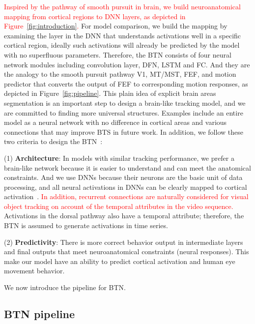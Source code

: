 \documentclass[journal]{IEEEtran}
\begin{document}
\textcolor{red}{
	Inspired by the pathway of smooth pursuit in brain, we build neuroanatomical mapping from cortical regions to DNN layers, as depicted in Figure~\ref{fig:introduction}.}
For model comparison, we build the mapping by examining the layer in the DNN that understands activations well in a specific cortical region, 
ideally such activations will already be predicted by the model with no superfluous parameters. 
Therefore, the BTN consists of four neural network modules including convolution layer, DFN, LSTM and FC.
And they are the analogy to the smooth pursuit pathway V1, MT/MST, FEF, 
and motion predictor that converts the output of FEF to corresponding motion responses, as depicted in Figure~\ref{fig:pipeline}. 
This plain idea of explicit brain areas segmentation is an important step to design a brain-like tracking model, 
and we are committed to finding more universal structures. 
Examples include an entire model as a neural network with no difference in cortical areas
and various connections that may improve BTS in future work.
In addition, we follow these two criteria to design the BTN~\cite{kubilius2018predict}:

(1) \textbf{Architecture}: In models with similar tracking performance, we prefer a brain-like network because it is easier to understand and can meet the anatomical constraints.
And we use DNNs because their neurons are the basic unit of data processing, 
and all neural activations in DNNs can be clearly mapped to cortical activation~\cite{yamins2016using}.
\textcolor{red}{
	In addition, recurrent connections are naturally considered for visual object tracking on account of the temporal attributes in the video sequence.}
Activations in the dorsal pathway also have a temporal attribute; 
therefore, the BTN is assumed to generate activations in time series.

(2) \textbf{Predictivity}: 
There is more correct behavior output in intermediate layers and final outputs that meet neuroanatomical constraints (neural responses). 
This make our model have an ability to predict cortical activation and human eye movement behavior.

We now introduce the pipeline for BTN. 


\subsection{BTN pipeline} \label{sec:cornet_s_def}
\end{document}
